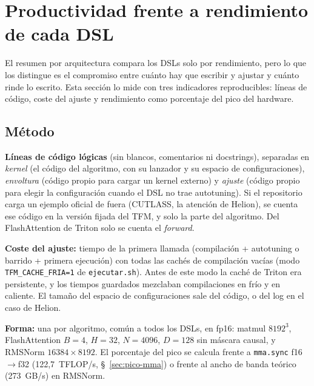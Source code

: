 
\section{Productividad frente a rendimiento de cada DSL}
\label{sec:productividad}

El resumen por arquitectura compara los DSLs solo por rendimiento, pero lo que los distingue es
el compromiso entre cuánto hay que escribir y ajustar y cuánto rinde lo escrito. Esta sección lo
mide con tres indicadores reproducibles: líneas de código, coste del ajuste y rendimiento como
porcentaje del pico del hardware.

\subsection{Método}

\textbf{Líneas de código lógicas} (sin blancos, comentarios ni docstrings), separadas en
\emph{kernel} (el código del algoritmo, con su lanzador y su espacio de configuraciones),
\emph{envoltura} (código propio para cargar un kernel externo) y \emph{ajuste} (código propio
para elegir la configuración cuando el DSL no trae autotuning). Si el repositorio carga un
ejemplo oficial de fuera (CUTLASS, la atención de Helion), se cuenta ese código en la versión
fijada del TFM, y solo la parte del algoritmo. Del FlashAttention de Triton solo se cuenta el
\emph{forward}.

\textbf{Coste del ajuste:} tiempo de la primera llamada (compilación + autotuning o barrido +
primera ejecución) con todas las cachés de compilación vacías (modo \texttt{TFM\_CACHE\_FRIA=1}
de \texttt{ejecutar.sh}). Antes de este modo la caché de Triton era persistente, y los tiempos
guardados mezclaban compilaciones en frío y en caliente. El tamaño del espacio de
configuraciones sale del código, o del log en el caso de Helion.

\textbf{Forma:} una por algoritmo, común a todos los DSLs, en fp16: matmul $8192^3$,
FlashAttention $B=4$, $H=32$, $N=4096$, $D=128$ sin máscara causal, y RMSNorm
$16384\times 8192$. El porcentaje del pico se calcula frente a \texttt{mma.sync} f16$\to$f32
(122{,}7~TFLOP/s, §~\ref{sec:pico-mma}) o frente al ancho de banda teórico (273~GB/s) en
RMSNorm.

